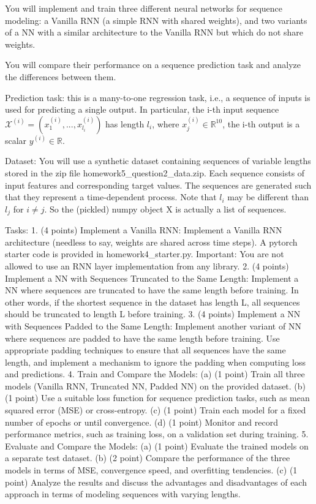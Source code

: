 \documentclass[
  letterpaper,
  DIV=11,
  numbers=noendperiod]{scrartcl}
\begin{document}
You will implement and train three different neural networks for
sequence modeling: a Vanilla RNN (a simple RNN with shared weights), and
two variants of a NN with a similar architecture to the Vanilla RNN but
which do not share weights.

You will compare their performance on a sequence prediction task and
analyze the differences between them.

Prediction task: this is a many-to-one regression task, i.e., a sequence
of inputs is used for predicting a single output. In particular, the
i-th input sequence
\(\mathcal{X}^{(i)}=(x_{1}^{(i)},...,x_{l_{i}}^{(i)})\) has length
\(l_{i}\), where \(x_{j}^{(i)}\in\mathbb{R}^{10}\), the i-th output is a
scalar \(y^{(i)}\in\mathbb{R}\).

Dataset: You will use a synthetic dataset containing sequences of
variable lengths stored in the zip file homework5\_question2\_data.zip.
Each sequence consists of input features and corresponding target
values. The sequences are generated such that they represent a
time-dependent process. Note that \(l_{i}\) may be different than
\(l_{j}\) for \(i\ne j\). So the (pickled) numpy object X is actually a
list of sequences.

Tasks: 1. (4 points) Implement a Vanilla RNN: Implement a Vanilla RNN
architecture (needless to say, weights are shared across time steps). A
pytorch starter code is provided in homework4\_starter.py. Important:
You are not allowed to use an RNN layer implementation from any library.
2. (4 points) Implement a NN with Sequences Truncated to the Same
Length: Implement a NN where sequences are truncated to have the same
length before training. In other words, if the shortest sequence in the
dataset has length L, all sequences should be truncated to length L
before training. 3. (4 points) Implement a NN with Sequences Padded to
the Same Length: Implement another variant of NN where sequences are
padded to have the same length before training. Use appropriate padding
techniques to ensure that all sequences have the same length, and
implement a mechanism to ignore the padding when computing loss and
predictions. 4. Train and Compare the Models: (a) (1 point) Train all
three models (Vanilla RNN, Truncated NN, Padded NN) on the provided
dataset. (b) (1 point) Use a suitable loss function for sequence
prediction tasks, such as mean squared error (MSE) or cross-entropy. (c)
(1 point) Train each model for a fixed number of epochs or until
convergence. (d) (1 point) Monitor and record performance metrics, such
as training loss, on a validation set during training. 5. Evaluate and
Compare the Models: (a) (1 point) Evaluate the trained models on a
separate test dataset. (b) (2 point) Compare the performance of the
three models in terms of MSE, convergence speed, and overfitting
tendencies. (c) (1 point) Analyze the results and discuss the advantages
and disadvantages of each approach in terms of modeling sequences with
varying lengths.
\end{document}
